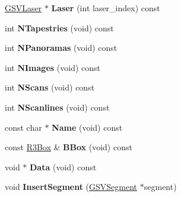 \begin{DoxyCompactItemize}
\item 
\hyperlink{class_g_s_v_laser}{G\+S\+V\+Laser} $\ast$ {\bfseries Laser} (int laser\+\_\+index) const \hypertarget{class_g_s_v_run_aac89e43183d6a8240c5b9988a9a75b76}{}\label{class_g_s_v_run_aac89e43183d6a8240c5b9988a9a75b76}

\item 
int {\bfseries N\+Tapestries} (void) const \hypertarget{class_g_s_v_run_a7d8abb40a5811dab4c94f3e5583615c7}{}\label{class_g_s_v_run_a7d8abb40a5811dab4c94f3e5583615c7}

\item 
int {\bfseries N\+Panoramas} (void) const \hypertarget{class_g_s_v_run_a954cd4b73b36112f20f3f007afbd896e}{}\label{class_g_s_v_run_a954cd4b73b36112f20f3f007afbd896e}

\item 
int {\bfseries N\+Images} (void) const \hypertarget{class_g_s_v_run_a612fd9968cdb83d22c310f2dd4bfb2d4}{}\label{class_g_s_v_run_a612fd9968cdb83d22c310f2dd4bfb2d4}

\item 
int {\bfseries N\+Scans} (void) const \hypertarget{class_g_s_v_run_af23d1e05578db51a723ff61e2b470d5d}{}\label{class_g_s_v_run_af23d1e05578db51a723ff61e2b470d5d}

\item 
int {\bfseries N\+Scanlines} (void) const \hypertarget{class_g_s_v_run_aa9c6ebdebe1011f78a2c42782fe08617}{}\label{class_g_s_v_run_aa9c6ebdebe1011f78a2c42782fe08617}

\item 
const char $\ast$ {\bfseries Name} (void) const \hypertarget{class_g_s_v_run_a3c09aa34e71e26d2e495c13874d93ce9}{}\label{class_g_s_v_run_a3c09aa34e71e26d2e495c13874d93ce9}

\item 
const \hyperlink{class_r3_box}{R3\+Box} \& {\bfseries B\+Box} (void) const \hypertarget{class_g_s_v_run_a0f0cf65c69112030dc3298af2282397d}{}\label{class_g_s_v_run_a0f0cf65c69112030dc3298af2282397d}

\item 
void $\ast$ {\bfseries Data} (void) const \hypertarget{class_g_s_v_run_a7d7a4755376b992e1813e333d0e65ca0}{}\label{class_g_s_v_run_a7d7a4755376b992e1813e333d0e65ca0}

\item 
void {\bfseries Insert\+Segment} (\hyperlink{class_g_s_v_segment}{G\+S\+V\+Segment} $\ast$segment)\hypertarget{class_g_s_v_run_a456c5bfafb2683600f4a2b21b3d46bc7}{}\label{class_g_s_v_run_a456c5bfafb2683600f4a2b21b3d46bc7}


\end{DoxyCompactItemize}

